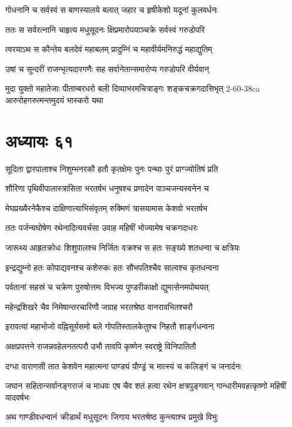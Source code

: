 \twolineshloka
{गोधनानि च सर्वस्वं स बाणस्यालये बलात्}
{जहार च हृषीकेशो यदूनां कुलवर्धनः}


\twolineshloka
{ततः स सर्वरत्नानि चाहृत्य मधुसूदनः}
{क्षिप्रमारोपयाञ्चक्रे सर्वस्वं गरुडोपरि}


\twolineshloka
{त्वरयाऽथ स कौन्तेय बलदेवं महाबलम्}
{प्रादुम्निं च महावीर्यमनिरुद्धं महाद्युतिम्}


\twolineshloka
{उषां च सुन्दरीं राजन्भृत्यदारगणैः सह}
{सर्वानेतान्समारोप्य गरुडोपरि वीर्यवान्}


\threelineshloka
{मुदा युक्तो महातेजाः पीताम्बरधरो बली}
{दिव्याभरमचित्राङ्गः शङ्कचक्रगदासिभृत्}
{2-60-38ca आरुरोहगरुत्मन्तमुदयं भास्करो यथा}


\chapter{अध्यायः ६१}
\twolineshloka
{सूदिता द्वारपालाश्च निशुम्भनरकौ हतौ}
{कृतक्षेमः पुनः पन्थाः पुरं प्राग्ज्योतिषं प्रति}


\twolineshloka
{शौरिणा पृथिवीपालास्त्रासिता भरतर्षभ}
{धनुषश्च प्रणादेन पाञ्चजन्यस्वनेन च}


\twolineshloka
{मेघप्रख्यैरनेकैश्च दाक्षिणात्याभिसंवृतम्}
{रुक्मिणं त्रासयामास केशवो भरतर्षभ}


\twolineshloka
{ततः पर्जन्यघोषेण रथेनादित्यवर्चसा}
{उवाह महिषीं भोज्यामेष चक्रगदाधरः}


\twolineshloka
{जारूथ्य आहृतक्रोधः शिशुपालश्च निर्जितः}
{वक्रश्च स हतः सङ्ख्ये शतधन्वा च क्षत्रियः}


\twolineshloka
{इन्द्रद्युम्नो हतः कोपाद्यवनश्च कशेरुकः}
{हतः सौभपतिश्चैव साल्वश्च कृतधन्वना}


\twolineshloka
{पर्वतानां सहस्रं च चक्रेण पुरुषोत्तमः}
{विभज्य पुण्डरीकाक्षो द्युमत्सेनमपोथयत्}


\twolineshloka
{महेन्द्रशिखरे चैव निमेषान्तरचारिणौ}
{जग्राह भरतश्रेष्ठ वानरावभितश्चरौ}


\twolineshloka
{इरावत्यां महाभोजो वह्निसूर्यसमो बले}
{गोपतिस्तालकेतुश्च निहतौ शार्ङ्गधन्वना}


\twolineshloka
{अक्षप्रपत्तने राजन्नवहेलनतत्परौ}
{उभौ तावपि कृष्णेन स्वराष्ट्रे विनिपातितौ}


\twolineshloka
{दग्धा वाराणसी तात केशवेन महात्मना}
{पाण्ड्यं पौण्ड्रं च मात्स्यं च कलिङ्गं च जनार्दनः}


जघान सहितान्सर्वानङ्गराजं च माधवः
\twolineshloka
{एष चैव शतं हत्वा रथेन क्षत्रपुङ्गवान्}
{गान्धारीमवहत्कृष्णो महिषीं यादवर्षभः}


\twolineshloka
{अथ गाण्डीवधन्वानं क्रीडार्थं मधुसूदनः}
{जिगाय भरतश्रेष्ठ कुन्त्याश्च प्रमुखे विभुः}


